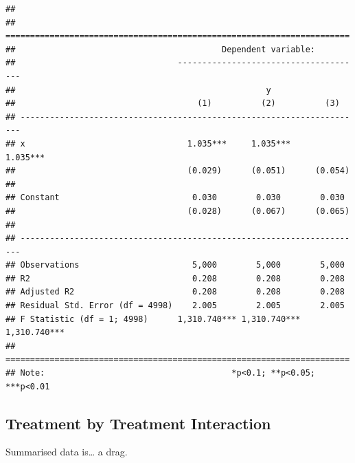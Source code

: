 \documentclass[
]{article}
\begin{document}
\begin{verbatim}
## 
## ======================================================================
##                                          Dependent variable:          
##                                 --------------------------------------
##                                                   y                   
##                                     (1)          (2)          (3)     
## ----------------------------------------------------------------------
## x                                 1.035***     1.035***     1.035***  
##                                   (0.029)      (0.051)      (0.054)   
##                                                                       
## Constant                           0.030        0.030        0.030    
##                                   (0.028)      (0.067)      (0.065)   
##                                                                       
## ----------------------------------------------------------------------
## Observations                       5,000        5,000        5,000    
## R2                                 0.208        0.208        0.208    
## Adjusted R2                        0.208        0.208        0.208    
## Residual Std. Error (df = 4998)    2.005        2.005        2.005    
## F Statistic (df = 1; 4998)      1,310.740*** 1,310.740*** 1,310.740***
## ======================================================================
## Note:                                      *p<0.1; **p<0.05; ***p<0.01
\end{verbatim}

\hypertarget{treatment-by-treatment-interaction}{%
\subsection{Treatment by Treatment Interaction}\label{treatment-by-treatment-interaction}}

Summarised data is\ldots{} a drag.
\end{document}

